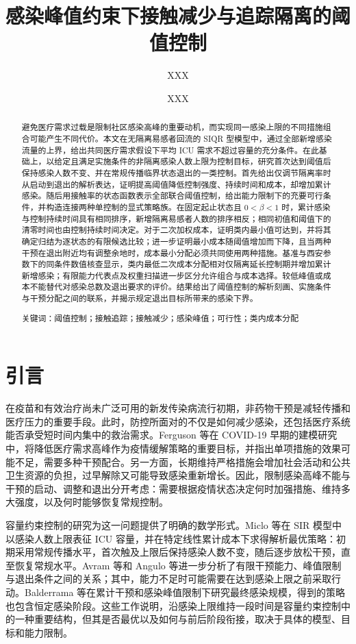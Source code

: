 \documentclass[lang=cn,a4paper,newtx]{elegantpaper}
\title{感染峰值约束下接触减少与追踪隔离的阈值控制}
\author{XXX \and XXX}
\institute{School of Mathematics and Statistics, Shaanxi Normal University}
\date{}
\numberwithin{equation}{section}
\theoremstyle{plain}
\begin{document}
\maketitle
\begin{abstract}
避免医疗需求过载是限制社区感染高峰的重要动机，而实现同一感染上限的不同措施组合可能产生不同代价。本文在无隔离易感者回流的 SIQR 型模型中，通过全部新增感染流量的上界，给出共同医疗需求假设下平均 ICU 需求不超过容量的充分条件。在此基础上，以给定且满足实施条件的非隔离感染人数上限为控制目标，研究首次达到阈值后保持感染人数不变、并在常规传播临界状态退出的一类控制。首先给出仅调节隔离率时从启动到退出的解析表达，证明提高阈值降低控制强度、持续时间和成本，却增加累计感染。随后用接触率的状态函数表示全部联合阈值控制，给出能力限制下的充要可行条件，并构造连接两种单控制的显式策略族。在固定起止状态且 $0<\beta<1$ 时，累计感染与控制持续时间具有相同排序，新增隔离易感者人数的排序相反；相同初值和阈值下的清零时间也由控制持续时间决定。对于二次加权成本，证明类内最小值可达到，并将其确定归结为逐状态的有限候选比较；进一步证明最小成本随阈值增加而下降，且当两种干预在退出附近均有调整余地时，成本最小分配必须共同使用两种措施。基准与西安参数下的同条件数值核查显示，类内最低二次成本分配相对仅隔离延长控制期并增加累计新增感染；有限能力代表点及权重扫描进一步区分允许组合与成本选择。较低峰值或成本不能替代对感染总数及退出要求的评价。结果给出了阈值控制的解析刻画、实施条件与干预分配之间的联系，并揭示规定退出目标所带来的感染下界。
\par\medskip\noindent 关键词：阈值控制；接触追踪；接触减少；感染峰值；可行性；类内成本分配
\end{abstract}

\section{引言}
\label{sec:introduction}
在疫苗和有效治疗尚未广泛可用的新发传染病流行初期，非药物干预是减轻传播和医疗压力的重要手段。此时，防控所面对的不仅是如何减少感染，还包括医疗系统能否承受短时间内集中的救治需求。Ferguson 等\cite{Ferguson2020Report9}在 COVID-19 早期的建模研究中，将降低医疗需求高峰作为疫情缓解策略的重要目标，并指出单项措施的效果可能不足，需要多种干预配合。另一方面，长期维持严格措施会增加社会活动和公共卫生资源的负担，过早解除又可能导致感染重新增长\cite{Duque2020}。因此，限制感染高峰不能与干预的启动、调整和退出分开考虑：需要根据疫情状态决定何时加强措施、维持多大强度，以及何时能够恢复常规控制。

容量约束控制的研究为这一问题提供了明确的数学形式。Miclo 等\cite{Miclo2022ICU}在 SIR 模型中以感染人数上限表征 ICU 容量，并在特定线性累计成本下求得解析最优策略：初期采用常规传播水平，首次触及上限后保持感染人数不变，随后逐步放松干预，直至恢复常规水平。Avram 等\cite{Avram2022}和 Angulo 等\cite{Angulo2021}进一步分析了有限干预能力、峰值限制与退出条件之间的关系；其中，能力不足时可能需要在达到感染上限之前采取行动。Balderrama 等\cite{Balderrama2024}在累计干预和感染峰值限制下研究最终感染规模，得到的策略也包含恒定感染阶段。这些工作说明，沿感染上限维持一段时间是容量约束控制中的一种重要结构，但其是否最优以及如何与前后阶段衔接，取决于具体的模型、目标和能力限制。
\end{document}
